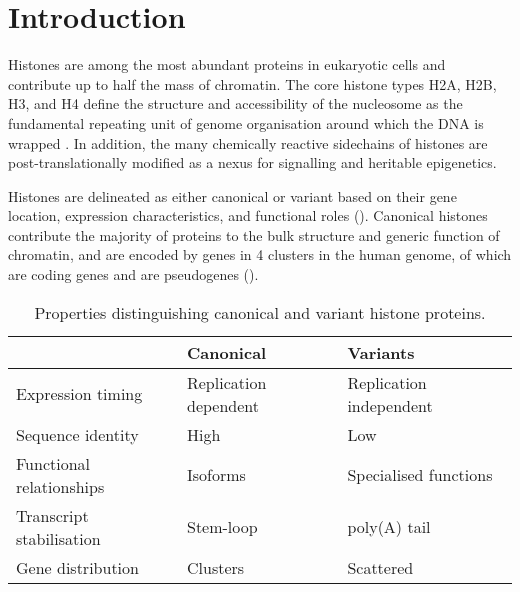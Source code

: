 \section{Introduction}

  Histones are among the most abundant proteins in eukaryotic cells
  and contribute up to half the mass of chromatin.
  The core histone types H2A, H2B, H3, and H4
  define the structure and accessibility of the nucleosome
  as the fundamental repeating unit of genome organisation
  around which the DNA is wrapped \citep{Luger1997structure}.
  In addition, the many chemically reactive sidechains of histones
  are post-translationally modified
  as a nexus for signalling and heritable epigenetics.

  Histones are delineated as either canonical or variant based on
  their gene location, expression characteristics,
  and functional roles ().
  Canonical histones contribute the majority of proteins to
  the bulk structure and generic function of chromatin,
  and are encoded by \TotalGenes{} genes in 4 clusters in the human genome,
  of which \TotalCodingGenes{} are coding genes and \TotalPseudoGenes{}
  are pseudogenes ().

  \begin{table}
    \caption{Properties distinguishing canonical and variant histone proteins.}
    \label{tab:typical-histone-differences}
    \centering
    \begin{tabular}{l l l}
      \toprule
      \null                     & Canonical             & Variants \\
      \midrule
      Expression timing         & Replication dependent & Replication independent \\
      Sequence identity         & High                  & Low \\
      Functional relationships  & Isoforms              & Specialised functions \\
      Transcript stabilisation  & Stem-loop             & poly(A) tail \\
      Gene distribution         & Clusters              & Scattered \\
      \bottomrule
    \end{tabular}
  \end{table}

